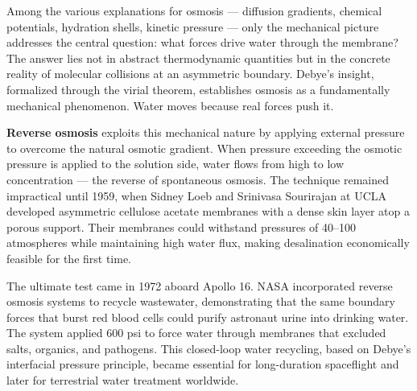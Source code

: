 Among the various explanations for osmosis — diffusion gradients, chemical potentials, hydration shells, kinetic pressure — only the mechanical picture addresses the central question: what forces drive water through the membrane? The answer lies not in abstract thermodynamic quantities but in the concrete reality of molecular collisions at an asymmetric boundary. Debye's insight, formalized through the virial theorem, establishes osmosis as a fundamentally mechanical phenomenon. Water moves because real forces push it.

\textbf{Reverse osmosis} exploits this mechanical nature by applying external pressure to overcome the natural osmotic gradient. When pressure exceeding the osmotic pressure is applied to the solution side, water flows from high to low concentration — the reverse of spontaneous osmosis. The technique remained impractical until 1959, when Sidney Loeb and Srinivasa Sourirajan at UCLA developed asymmetric cellulose acetate membranes with a dense skin layer atop a porous support. Their membranes could withstand pressures of 40–100 atmospheres while maintaining high water flux, making desalination economically feasible for the first time.

The ultimate test came in 1972 aboard Apollo 16. NASA incorporated reverse osmosis systems to recycle wastewater, demonstrating that the same boundary forces that burst red blood cells could purify astronaut urine into drinking water. The system applied 600 psi to force water through membranes that excluded salts, organics, and pathogens. This closed-loop water recycling, based on Debye's interfacial pressure principle, became essential for long-duration spaceflight and later for terrestrial water treatment worldwide.
